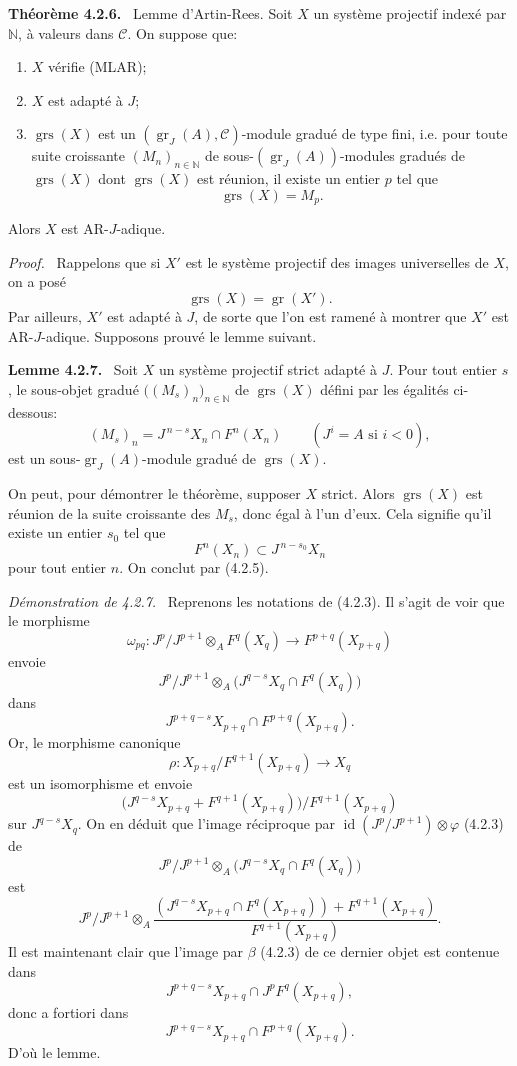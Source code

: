 \documentclass[11pt]{article}
\newenvironment{statement}[1]{\par\medskip\noindent\textbf{#1.}\ }{\par\medskip}
\newenvironment{prooftext}[1][Proof]{\par\noindent\emph{#1.}\ }{\par\medskip}
\providecommand{\gr}{\operatorname{gr}}
\providecommand{\id}{\operatorname{id}}
\providecommand{\id}{\operatorname{id}}
\providecommand{\gr}{\operatorname{gr}}
\providecommand{\gr}{\operatorname{gr}}
\providecommand{\grs}{\operatorname{grs}}
\providecommand{\id}{\operatorname{id}}
\providecommand{\id}{\operatorname{id}}
\providecommand{\id}{\operatorname{id}}
\providecommand{\id}{\operatorname{id}}
\begin{document}
\begin{statement}{Théorème 4.2.6}
Lemme d'Artin-Rees. Soit \(X\) un système projectif indexé par \(\mathbb N\), à valeurs dans \(\mathcal C\). On suppose que:
\begin{enumerate}[label=\textup{(\roman*)}]
\item \(X\) vérifie (MLAR);
\item \(X\) est adapté à \(J\);
\item \(\grs(X)\) est un \((\gr_J(A),\mathcal C)\)-module gradué de type fini, i.e. pour toute suite croissante \((M_n)_{n\in\mathbb N}\) de sous-\((\gr_J(A))\)-modules gradués de \(\grs(X)\) dont \(\grs(X)\) est réunion, il existe un entier \(p\) tel que
\[
\grs(X)=M_p.
\]
\end{enumerate}
Alors \(X\) est AR-\(J\)-adique.
\end{statement}

\begin{prooftext}
Rappelons que si \(X'\) est le système projectif des images universelles de \(X\), on a posé
\[
\grs(X)=\gr(X').
\]
Par ailleurs, \(X'\) est adapté à \(J\), de sorte que l'on est ramené à montrer que \(X'\) est AR-\(J\)-adique. Supposons prouvé le lemme suivant.
\end{prooftext}

\begin{statement}{Lemme 4.2.7}
Soit \(X\) un système projectif strict adapté à \(J\). Pour tout entier \(s\), le sous-objet gradué \(\bigl((M_s)_n\bigr)_{n\in\mathbb N}\) de \(\grs(X)\) défini par les égalités ci-dessous:
\[
(M_s)_n=J^{\,n-s}X_n\cap F^n(X_n)\qquad(J^i=A\text{ si }i<0),
\]
est un sous-\(\gr_J(A)\)-module gradué de \(\grs(X)\).
\end{statement}

On peut, pour démontrer le théorème, supposer \(X\) strict. Alors \(\grs(X)\) est réunion de la suite croissante des \(M_s\), donc égal à l'un d'eux. Cela signifie qu'il existe un entier \(s_0\) tel que
\[
F^n(X_n)\subset J^{\,n-s_0}X_n
\]
pour tout entier \(n\). On conclut par (4.2.5).

\begin{prooftext}[Démonstration de 4.2.7]
Reprenons les notations de (4.2.3). Il s'agit de voir que le morphisme
\[
\omega_{pq}:J^p/J^{p+1}\otimes_A F^q(X_q)\longrightarrow F^{p+q}(X_{p+q})
\]
envoie
\[
J^p/J^{p+1}\otimes_A
\bigl(J^{q-s}X_q\cap F^q(X_q)\bigr)
\]
dans
\[
J^{p+q-s}X_{p+q}\cap F^{p+q}(X_{p+q}).
\]
Or, le morphisme canonique
\[
\rho:X_{p+q}/F^{q+1}(X_{p+q})\longrightarrow X_q
\]
est un isomorphisme et envoie
\[
\bigl(J^{q-s}X_{p+q}+F^{q+1}(X_{p+q})\bigr)/F^{q+1}(X_{p+q})
\]
sur \(J^{q-s}X_q\). On en déduit que l'image réciproque par
\(\id(J^p/J^{p+1})\otimes\varphi\) (4.2.3) de
\[
J^p/J^{p+1}\otimes_A
\bigl(J^{q-s}X_q\cap F^q(X_q)\bigr)
\]
est
\[
J^p/J^{p+1}\otimes_A
\frac{(J^{q-s}X_{p+q}\cap F^q(X_{p+q}))+F^{q+1}(X_{p+q})}
     {F^{q+1}(X_{p+q})}.
\]
Il est maintenant clair que l'image par \(\beta\) (4.2.3) de ce dernier objet est contenue dans
\[
J^{p+q-s}X_{p+q}\cap J^pF^q(X_{p+q}),
\]
donc a fortiori dans
\[
J^{p+q-s}X_{p+q}\cap F^{p+q}(X_{p+q}).
\]
D'où le lemme.
\end{prooftext}
\end{document}
